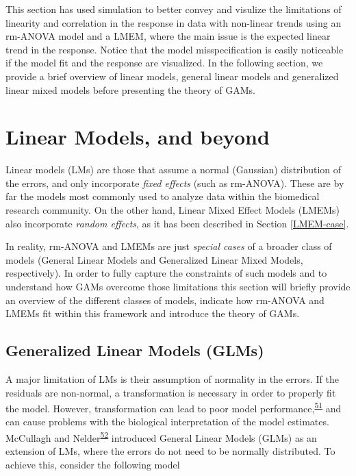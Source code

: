 \documentclass[
]{article}
\begin{document}
This section has used simulation to better convey and visulize the limitations of linearity and correlation in the response in data with non-linear trends using an rm-ANOVA model and a LMEM, where the main issue is the expected linear trend in the response. Notice that the model misspecification is easily noticeable if the model fit and the response are visualized. In the following section, we provide a brief overview of linear models, general linear models and generalized linear mixed models before presenting the theory of GAMs.

\hypertarget{linear-models-and-beyond}{%
\section{Linear Models, and beyond}\label{linear-models-and-beyond}}

Linear models (LMs) are those that assume a normal (Gaussian) distribution of the errors, and only incorporate \emph{fixed effects} (such as rm-ANOVA). These are by far the models most commonly used to analyze data within the biomedical research community. On the other hand, Linear Mixed Effect Models (LMEMs) also incorporate \emph{random effects}, as it has been described in Section \ref{LMEM-case}.

In reality, rm-ANOVA and LMEMs are just \emph{special cases} of a broader class of models (General Linear Models and Generalized Linear Mixed Models, respectively). In order to fully capture the constraints of such models and to understand how GAMs overcome those limitations this section will briefly provide an overview of the different classes of models, indicate how rm-ANOVA and LMEMs fit within this framework and introduce the theory of GAMs.

\hypertarget{generalized-linear-models-glms}{%
\subsection{Generalized Linear Models (GLMs)}\label{generalized-linear-models-glms}}

A major limitation of LMs is their assumption of normality in the errors. If the residuals are non-normal, a transformation is necessary in order to properly fit the model. However, transformation can lead to poor model performance,\textsuperscript{\protect\hyperlink{ref-ohara2010}{51}} and can cause problems with the biological interpretation of the model estimates. McCullagh and Nelder\textsuperscript{\protect\hyperlink{ref-nelder1972}{52}} introduced General Linear Models (GLMs) as an extension of LMs, where the errors do not need to be normally distributed. To achieve this, consider the following model
\end{document}
